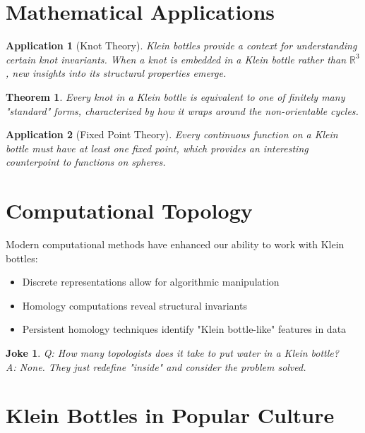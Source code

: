 \documentclass{article}
\newtheorem{theorem}{Theorem}
\newtheorem{application}{Application}
\newtheorem{joke}{Joke}
\begin{document}
\section{Mathematical Applications}

\begin{application}[Knot Theory]
    Klein bottles provide a context for understanding certain knot invariants. When a knot is embedded in a Klein bottle rather than $\mathbb{R}^3$, new insights into its structural properties emerge.
\end{application}

\begin{theorem}
    Every knot in a Klein bottle is equivalent to one of finitely many "standard" forms, characterized by how it wraps around the non-orientable cycles.
\end{theorem}

\begin{application}[Fixed Point Theory]
    Every continuous function on a Klein bottle must have at least one fixed point, which provides an interesting counterpoint to functions on spheres.
\end{application}

\section{Computational Topology}

Modern computational methods have enhanced our ability to work with Klein bottles:

\begin{itemize}
    \item Discrete representations allow for algorithmic manipulation
    \item Homology computations reveal structural invariants
    \item Persistent homology techniques identify "Klein bottle-like" features in data
\end{itemize}

\begin{joke}
    Q: How many topologists does it take to put water in a Klein bottle?\\
    A: None. They just redefine "inside" and consider the problem solved.
\end{joke}

\section{Klein Bottles in Popular Culture}
\end{document}
